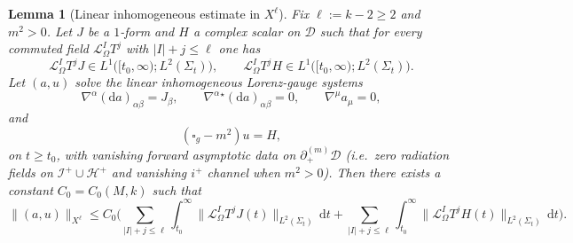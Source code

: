 \documentclass[11pt]{article}
\numberwithin{equation}{section}
\theoremstyle{plain}
\newtheorem{lemma}[theorem]{Lemma}
\theoremstyle{definition}
\theoremstyle{remark}
\newcommand{\D}{\mathcal{D}}
\newcommand{\dd}{\mathrm{d}}
\begin{document}
\begin{lemma}[Linear inhomogeneous estimate in $X^{\ell}$]\label{lem:linear-final-state-map}
Fix $\ell:=k-2\ge 2$ and $m^{2}>0$.
Let $J$ be a $1$-form and $H$ a complex scalar on $\D$ such that for every commuted field
$\mathcal L_{\Omega}^{I}T^{j}$ with $|I|+j\le \ell$ one has
\begin{equation}
\mathcal L_{\Omega}^{I}T^{j}J\in L^{1}\bigl([t_0,\infty);L^{2}(\Sigma_t)\bigr),
\qquad
\mathcal L_{\Omega}^{I}T^{j}H\in L^{1}\bigl([t_0,\infty);L^{2}(\Sigma_t)\bigr).
\end{equation}
Let $(a,u)$ solve the linear inhomogeneous Lorenz-gauge systems
\begin{equation}\label{eq:linear-inhom-maxwell-waveop}
\nabla^\alpha (\dd a)_{\alpha\beta}=J_\beta,
\qquad
\nabla^\alpha{}^\star(\dd a)_{\alpha\beta}=0,
\qquad
\nabla^\mu a_\mu=0,
\end{equation}
and
\begin{equation}\label{eq:linear-inhom-kg-waveop}
(\square_g-m^{2})u=H,
\end{equation}
on $t\ge t_0$, with \emph{vanishing forward asymptotic data} on $\partial_{+}^{(m)}\D$
(i.e.\ zero radiation fields on $\mathcal I^{+}\cup\mathcal H^{+}$ and vanishing $i^{+}$ channel when $m^{2}>0$).
Then there exists a constant $C_{0}=C_{0}(M,k)$ such that
\begin{equation}\label{eq:linear-final-state-X}
\|(a,u)\|_{X^{\ell}}
\le
C_{0}\Biggl(
\sum_{|I|+j\le\ell}\int_{t_0}^{\infty}\|\mathcal L_{\Omega}^{I}T^{j}J(t)\|_{L^{2}(\Sigma_t)}\,\dd t
+
\sum_{|I|+j\le\ell}\int_{t_0}^{\infty}\|\mathcal L_{\Omega}^{I}T^{j}H(t)\|_{L^{2}(\Sigma_t)}\,\dd t
\Biggr).
\end{equation}
\end{lemma}
\end{document}
